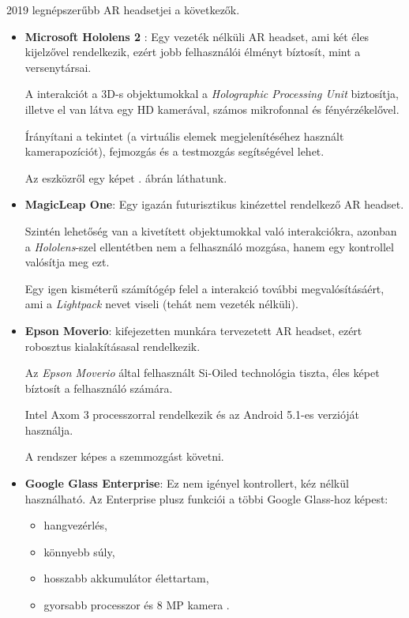 2019 legnépszerűbb AR headsetjei a következők.
\begin{itemize}
\item {\bf Microsoft Hololens 2} \cite{kalantari2018exploring}: Egy vezeték nélküli AR headset, ami két éles kijelzővel rendelkezik, ezért jobb felhasználói élményt bíztosít, mint a versenytársai.

A interakciót a 3D-s objektumokkal a \textit{Holographic Processing Unit} biztosítja, illetve el van látva egy HD kamerával, számos mikrofonnal és fényérzékelővel.

Írányítani a tekintet (a virtuális elemek megjelenítéséhez használt kamerapozíciót), fejmozgás és a testmozgás segítségével lehet.

Az eszközről egy képet . ábrán láthatunk.

\item {\bf MagicLeap One}: Egy igazán futurisztikus kinézettel rendelkező AR headset.

Szintén lehetőség van a kivetített objektumokkal való interakciókra, azonban a \textit{Hololens}-szel ellentétben nem a felhasználó mozgása, hanem egy kontrollel valósítja meg ezt. 

Egy igen kisméterű számítógép felel a interakció további megvalósításáért, ami a \textit{Lightpack} nevet viseli (tehát nem vezeték nélküli).
  
\item {\bf Epson Moverio}: kifejezetten munkára tervezetett AR headset, ezért robosztus kialakításasal rendelkezik.

Az \textit{Epson Moverio} által felhasznált Si-Oiled technológia tiszta, éles képet bíztosít a felhasználó számára.

Intel Axom 3 processzorral rendelkezik és az Android 5.1-es verzióját használja. 

A rendszer képes a szemmozgást követni.

\item {\bf Google Glass Enterprise}: Ez nem igényel kontrollert, kéz nélkül használható.
Az Enterprise plusz funkciói a többi Google Glass-hoz képest:
\begin{itemize}
\item hangvezérlés,
\item könnyebb súly,
\item hosszabb akkumulátor élettartam,
\item gyorsabb processzor és 8 MP kamera \cite{arhardware}.
\end{itemize}
\end{itemize}

